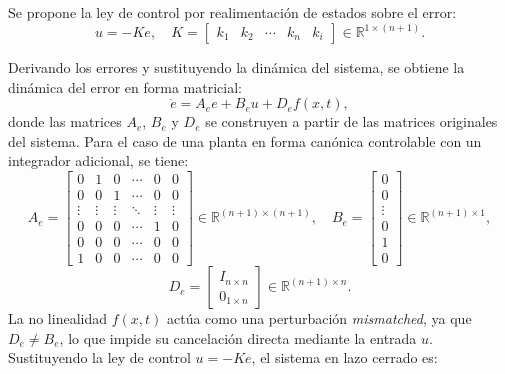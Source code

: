 \begin{itemize}
Se propone la ley de control por realimentación de estados sobre el error:
\begin{equation*}
    u = -K e, \quad K = \begin{bmatrix} k_1 & k_2 & \cdots & k_n & k_i \end{bmatrix} \in \mathbb{R}^{1 \times (n+1)}.
\end{equation*}

Derivando los errores y sustituyendo la dinámica del sistema, se obtiene la dinámica del error en forma matricial:
\begin{equation*}
    \dot{e} = A_e e + B_e u + D_e f(x,t),
\end{equation*}
donde las matrices \(A_e\), \(B_e\) y \(D_e\) se construyen a partir de las matrices originales del sistema. Para el caso de una planta en forma canónica controlable con un integrador adicional, se tiene:
\begin{equation*}
    A_e = \begin{bmatrix}
        0 & 1 & 0 & \cdots & 0 & 0 \\
        0 & 0 & 1 & \cdots & 0 & 0 \\
        \vdots & \vdots & \vdots & \ddots & \vdots & \vdots \\
        0 & 0 & 0 & \cdots & 1 & 0 \\
        0 & 0 & 0 & \cdots & 0 & 0 \\
        1 & 0 & 0 & \cdots & 0 & 0
    \end{bmatrix} \in \mathbb{R}^{(n+1) \times (n+1)}, \quad
    B_e = \begin{bmatrix} 0 \\ 0 \\ \vdots \\ 0 \\ 1 \\ 0 \end{bmatrix} \in \mathbb{R}^{(n+1) \times 1},
\end{equation*}
\begin{equation*}
    D_e = \begin{bmatrix}
        I_{n \times n} \\
        0_{1 \times n}
    \end{bmatrix} \in \mathbb{R}^{(n+1) \times n}.
\end{equation*}
La no linealidad \(f(x,t)\) actúa como una perturbación \textit{mismatched}, ya que \(D_e \neq B_e\), lo que impide su cancelación directa mediante la entrada \(u\). Sustituyendo la ley de control \(u = -K e\), el sistema en lazo cerrado es:


\end{itemize}
